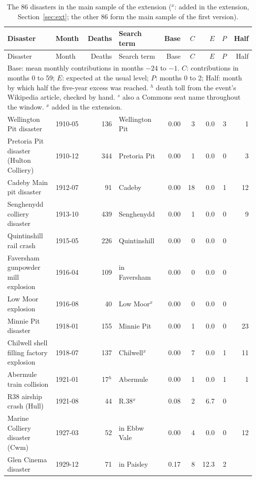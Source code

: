 \documentclass[11pt,a4paper]{article}
\begin{document}
{\footnotesize\begin{longtable}{p{5.2cm}lrlrrrrr}\caption{The 86 disasters in the main sample of the extension ($^x$: added in the extension, Section~\ref{sec:ext}; the other 86 form the main sample of the first version).}\label{tab:events}\\\toprule Disaster & Month & Deaths & Search term & Base & $C$ & $E$ & $P$ & Half\\\midrule\endfirsthead\toprule Disaster & Month & Deaths & Search term & Base & $C$ & $E$ & $P$ & Half\\\midrule\endhead\bottomrule\multicolumn{9}{p{15cm}}{\footnotesize Base: mean monthly contributions in months $-24$ to $-1$. $C$: contributions in months 0 to 59; $E$: expected at the usual level; $P$: months 0 to 2; Half: month by which half the five-year excess was reached. $^h$ death toll from the event's Wikipedia article, checked by hand. $^s$ also a Commons seat name throughout the window. $^x$ added in the extension.}\\\endlastfoot
Wellington Pit disaster & 1910-05 & 136 & Wellington Pit & 0.00 & 3 & 0.0 & 3 & 1\\
Pretoria Pit disaster (Hulton Colliery) & 1910-12 & 344 & Pretoria Pit & 0.00 & 1 & 0.0 & 0 & 3\\
Cadeby Main pit disaster & 1912-07 & 91 & Cadeby & 0.00 & 18 & 0.0 & 1 & 12\\
Senghenydd colliery disaster & 1913-10 & 439 & Senghenydd & 0.00 & 1 & 0.0 & 0 & 9\\
Quintinshill rail crash & 1915-05 & 226 & Quintinshill & 0.00 & 0 & 0.0 & 0 & \\
Faversham gunpowder mill explosion & 1916-04 & 109 & in Faversham & 0.00 & 0 & 0.0 & 0 & \\
Low Moor explosion & 1916-08 & 40 & Low Moor$^x$ & 0.00 & 0 & 0.0 & 0 & \\
Minnie Pit disaster & 1918-01 & 155 & Minnie Pit & 0.00 & 1 & 0.0 & 0 & 23\\
Chilwell shell filling factory explosion & 1918-07 & 137 & Chilwell$^x$ & 0.00 & 7 & 0.0 & 1 & 11\\
Abermule train collision & 1921-01 & 17$^h$ & Abermule & 0.00 & 1 & 0.0 & 1 & 1\\
R38 airship crash (Hull) & 1921-08 & 44 & R.38$^x$ & 0.08 & 2 & 6.7 & 0 & \\
Marine Colliery disaster (Cwm) & 1927-03 & 52 & in Ebbw Vale & 0.00 & 4 & 0.0 & 0 & 12\\
Glen Cinema disaster & 1929-12 & 71 & in Paisley & 0.17 & 8 & 12.3 & 2 & \\

\end{longtable}}
\end{document}
